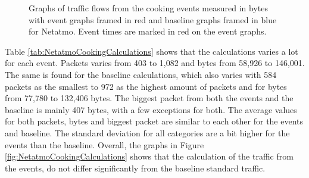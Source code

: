 \begin{figure}[H]
\begin{subfigure}[b]{0.47\textwidth}
        \centering
    \end{subfigure}
        \begin{subfigure}[b]{0.47\textwidth}
        \centering
    \end{subfigure}
    \begin{subfigure}[b]{0.47\textwidth}
        \centering
    \end{subfigure}
    \begin{subfigure}[b]{0.47\textwidth}
        \centering
    \end{subfigure}
    \hspace{0.6cm}
    \begin{subfigure}[b]{0.47\textwidth}
    \centering
        \end{subfigure}
    \caption{Graphs of traffic flows from the cooking events measured in bytes with event graphs framed in red and baseline graphs framed in blue for Netatmo. Event times are marked in red on the event graphs.}    \label{fig:NetatmoCookingBytes2}
\end{figure}

Table \ref{tab:NetatmoCookingCalculations} shows that the calculations varies a lot for each event. Packets varies from 403 to 1,082 and bytes from 58,926 to 146,001. The same is found for the baseline calculations, which also varies with 584 packets as the smallest to 972 as the highest amount of packets and for bytes from 77,780 to 132,406 bytes. The biggest packet from both the events and the baseline is mainly 407 bytes, with a few exceptions for both. The average values for both packets, bytes and biggest packet are similar to each other for the events and baseline. The standard deviation for all categories are a bit higher for the events than the baseline. Overall, the graphs in Figure \ref{fig:NetatmoCookingCalculations} shows that the calculation of the traffic from the events, do not differ significantly from the baseline standard traffic.

